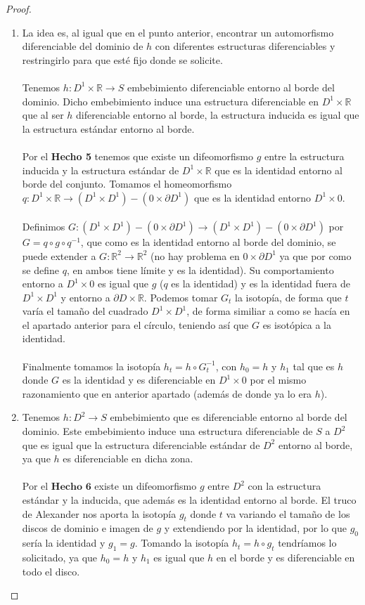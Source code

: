 \begin{proof}
\begin{enumerate}
			\item La idea es, al igual que en el punto anterior, encontrar un automorfismo diferenciable del dominio de $h$ con diferentes estructuras diferenciables y restringirlo para que esté fijo donde se solicite.\\
				\\ Tenemos $h: D^1\times \mathbb{R} \rightarrow S$ embebimiento diferenciable entorno al borde del dominio. Dicho embebimiento induce una estructura diferenciable en $D^1\times \mathbb{R}$ que al ser $h$ diferenciable entorno al borde, la estructura inducida es igual que la estructura estándar entorno al borde.\\
				\\ Por el \textbf{Hecho 5} tenemos que existe un difeomorfismo $g$ entre la estructura inducida y la estructura estándar de $D^1\times \mathbb{R}$ que es la identidad entorno al borde del conjunto. Tomamos el homeomorfismo $q: D^1\times \mathbb{R} \rightarrow (D^1\times D^1) - (0 \times \partial D^1)$ que es la identidad entorno $D^1\times 0$.\\
				\\ Definimos $G:  (D^1\times D^1) - (0 \times \partial D^1) \rightarrow (D^1\times D^1) - (0 \times \partial D^1)$ por $G = q \circ g \circ q^{-1}$, que como es la identidad entorno al borde del dominio, se puede extender a $G:\mathbb{R}^2 \rightarrow \mathbb{R}^2$  (no hay problema en $0 \times \partial D^1$ ya que por como se define $q$, en ambos tiene límite y es la identidad). Su comportamiento entorno a $D^1 \times 0$ es igual que $g$ ($q$ es la identidad) y es la identidad fuera de $D^1 \times D^1$ y entorno a $\partial D \times \mathbb{R}$. Podemos tomar $G_t$ la isotopía, de forma que $t$ varía el tamaño del cuadrado $D^1 \times D^1$, de forma similiar a como se hacía en el apartado anterior para el círculo, teniendo así que $G$ es isotópica a la identidad.\\
				\\ Finalmente tomamos la isotopía $h_t = h \circ G_t^{-1}$, con $h_0 = h$ y $h_1$ tal que es $h$ donde $G$ es la identidad y es diferenciable en $D^1 \times 0$ por el mismo razonamiento que en anterior apartado (además de donde ya lo era $h$).
			\item Tenemos $h: D^2 \rightarrow S$ embebimiento que es diferenciable entorno al borde del dominio. Este embebimiento induce una estructura diferenciable de $S$ a $D^2$ que es igual que la estructura diferenciable estándar de $D^2$ entorno al borde, ya que $h$ es diferenciable en dicha zona.\\
				\\ Por el $\textbf{Hecho 6}$ existe un difeomorfismo $g$ entre $D^2$ con la estructura estándar y la inducida, que además es la identidad entorno al borde. El truco de Alexander nos aporta la isotopía $g_t$ donde $t$ va variando el tamaño de los discos de dominio e imagen de $g$ y extendiendo por la identidad, por lo que $g_0$ sería la identidad y $g_1 = g$. Tomando la isotopía $h_t = h \circ g_t$ tendríamos lo solicitado, ya que $h_0 = h$ y $h_1$ es igual que $h$ en el borde y es diferenciable en todo el disco.
		\end{enumerate}
		

\end{proof}
